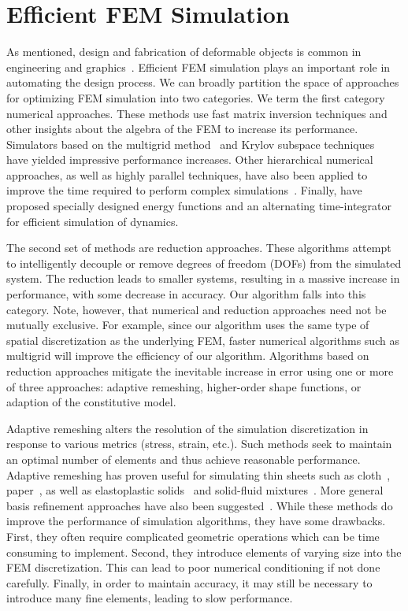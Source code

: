 \section{Efficient FEM Simulation}
As mentioned, design and fabrication of deformable objects is common in
engineering and graphics~\citep{bendsoe2004topology,Kou2012,McAdams2011}.
Efficient FEM simulation plays an important role in automating the design process.
We can broadly partition the space of approaches for
optimizing FEM simulation into two categories. We term the first
category numerical approaches. These methods use fast matrix inversion
techniques and other insights about the algebra of the FEM to increase its performance.
Simulators based on the multigrid method~\citep{Peraire1992,Zhu2010,McAdams2011}
and Krylov subspace techniques~\citep{Patterson2012} have yielded impressive performance increases.
Other hierarchical numerical approaches, as well as highly parallel techniques, have
also been applied to improve the time required to perform complex
simulations~\citep{Farhat1991,Mandel1993}.
Finally, \citet{Bouaziz:2014} have proposed specially designed energy functions and an
alternating time-integrator for efficient simulation of dynamics.

The second set of methods are reduction approaches.
These algorithms attempt to intelligently decouple or remove degrees of
freedom (DOFs) from the simulated system.
The reduction leads to smaller systems, resulting in a massive increase in performance, with some decrease in accuracy.
Our algorithm falls into this category.
Note, however, that numerical and reduction approaches need not be mutually exclusive.
For example, since our algorithm uses the same type of spatial discretization as the underlying FEM,
faster numerical algorithms such as multigrid will improve the efficiency of our algorithm.
Algorithms based on reduction approaches mitigate the inevitable increase in error using
one or more of three approaches: adaptive remeshing, higher-order
shape functions, or adaption of the constitutive model.

Adaptive remeshing alters the resolution of the simulation discretization
in response to various metrics (stress, strain, etc.). Such methods
seek to maintain an optimal number of elements and thus achieve
reasonable performance. Adaptive remeshing has proven useful
for simulating thin sheets such as cloth~\citep{Narain2012}, paper~\citep{Narain2013}, as well as elastoplastic solids~\citep{Wicke:2010} and solid-fluid mixtures~\citep{Clausen2013}.
More general basis refinement approaches have also been suggested~\citep{Debunne2001,Grinspun2002}.
While these methods do improve
the performance of simulation algorithms, they have some drawbacks.
First, they often require complicated geometric operations
which can be time consuming to implement.
Second, they introduce elements of varying size into the FEM discretization.
This can lead to poor numerical conditioning if not done carefully.
Finally, in order to maintain accuracy, it may still be necessary to introduce many
fine elements, leading to slow performance.

